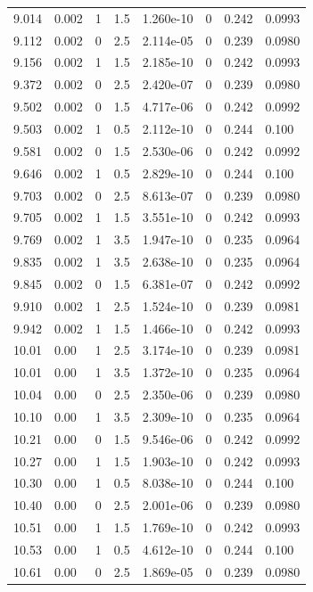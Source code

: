 \documentclass[preview]{standalone}
\begin{document}
{{{\begin{tabular}{L{1.2cm}C{1.2cm} C{0.3cm}C{0.5cm} C{1.4cm}C{1.4cm} C{1.4cm}C{1.4cm}}
  9.014  &  0.002  & 1     & 1.5 &  1.260e-10  & 0  & 0.242 &  0.0993   \\ 
  9.112  &  0.002  & 0     & 2.5 &  2.114e-05  & 0  & 0.239 &  0.0980   \\ 
  9.156  &  0.002  & 1     & 1.5 &  2.185e-10  & 0  & 0.242 &  0.0993   \\ 
  9.372  &  0.002  & 0     & 2.5 &  2.420e-07  & 0  & 0.239 &  0.0980   \\ 
  9.502  &  0.002  & 0     & 1.5 &  4.717e-06  & 0  & 0.242 &  0.0992   \\ 
  9.503  &  0.002  & 1     & 0.5 &  2.112e-10  & 0  & 0.244 &  0.100   \\ 
  9.581  &  0.002  & 0     & 1.5 &  2.530e-06  & 0  & 0.242 &  0.0992   \\ 
  9.646  &  0.002  & 1     & 0.5 &  2.829e-10  & 0  & 0.244 &  0.100   \\ 
  9.703  &  0.002  & 0     & 2.5 &  8.613e-07  & 0  & 0.239 &  0.0980   \\ 
  9.705  &  0.002  & 1     & 1.5 &  3.551e-10  & 0  & 0.242 &  0.0993   \\ 
  9.769  &  0.002  & 1     & 3.5 &  1.947e-10  & 0  & 0.235 &  0.0964   \\ 
  9.835  &  0.002  & 1     & 3.5 &  2.638e-10  & 0  & 0.235 &  0.0964   \\ 
  9.845  &  0.002  & 0     & 1.5 &  6.381e-07  & 0  & 0.242 &  0.0992   \\ 
  9.910  &  0.002  & 1     & 2.5 &  1.524e-10  & 0  & 0.239 &  0.0981   \\ 
  9.942  &  0.002  & 1     & 1.5 &  1.466e-10  & 0  & 0.242 &  0.0993   \\ 
  10.01  &  0.00  & 1     & 2.5 &  3.174e-10  & 0  & 0.239 &  0.0981   \\ 
  10.01  &  0.00  & 1     & 3.5 &  1.372e-10  & 0  & 0.235 &  0.0964   \\ 
  10.04  &  0.00  & 0     & 2.5 &  2.350e-06  & 0  & 0.239 &  0.0980   \\ 
  10.10  &  0.00  & 1     & 3.5 &  2.309e-10  & 0  & 0.235 &  0.0964   \\ 
  10.21  &  0.00  & 0     & 1.5 &  9.546e-06  & 0  & 0.242 &  0.0992   \\ 
  10.27  &  0.00  & 1     & 1.5 &  1.903e-10  & 0  & 0.242 &  0.0993   \\ 
  10.30  &  0.00  & 1     & 0.5 &  8.038e-10  & 0  & 0.244 &  0.100   \\ 
  10.40  &  0.00  & 0     & 2.5 &  2.001e-06  & 0  & 0.239 &  0.0980   \\ 
  10.51  &  0.00  & 1     & 1.5 &  1.769e-10  & 0  & 0.242 &  0.0993   \\ 
  10.53  &  0.00  & 1     & 0.5 &  4.612e-10  & 0  & 0.244 &  0.100   \\ 
  10.61  &  0.00  & 0     & 2.5 &  1.869e-05  & 0  & 0.239 &  0.0980   \\ 
\hline 
\end{tabular} 

}}}
\end{document}
